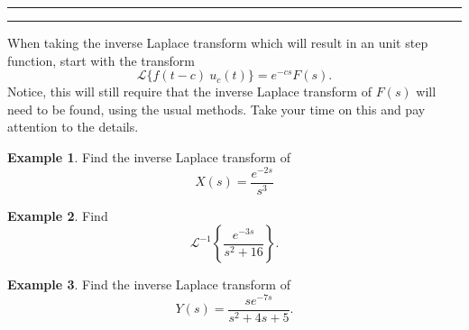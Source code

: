 \documentclass[12pt]{article}
\newcommand{\<}{\langle}
\renewcommand{\>}{\rangle}
\begin{document}
	\noindent\rule{7in}{0.4pt}

	\medskip

	{}

	\noindent\rule{7in}{0.4pt}
	
	\medskip

    \noindent When taking the inverse Laplace transform which will result in an unit step function, start with the transform
    \[
        \mathscr{L} \{f(t-c)\ u_c(t)\} = e^{-cs} F(s).
    \]
    Notice, this will still require that the inverse Laplace transform of $F(s)$ will need to be found, using the usual methods.  Take your time on this and pay attention to the details.   

    \medskip

    \noindent \textbf{Example 1}. Find the inverse Laplace transform of $\displaystyle{ }$
    \[
        X(s) = \frac{e^{-2s}}{s^3}
    \]
    \vfill

    \newpage

    \noindent \textbf{Example 2}. Find
    \[
        \mathscr{L}^{-1} \left\{ \frac{e^{-3s}}{s^2+16} \right\}.
    \]
    \vfill

    \newpage

    \noindent \textbf{Example 3}. Find the inverse Laplace transform of 
    \[
        Y(s) = \frac{se^{-7s}}{s^2+4s+5}.
    \]
    \vfill

    \newpage
\end{document}

